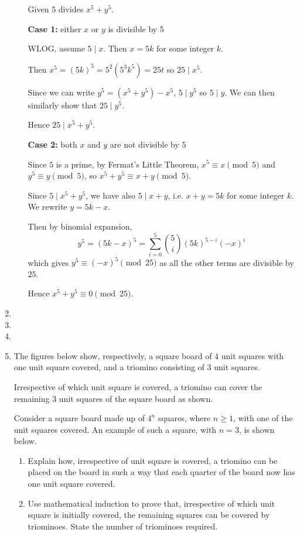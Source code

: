 \begin{enumerate}
\begin{solution}
\begin{enumerate}[label=(\roman*)]
Given $5$ divides $x^5+y^5$.

\textbf{Case 1:} either $x$ or $y$ is divisible by 5

WLOG, assume $5\mid x$. Then $x=5k$ for some integer $k$.

Then $x^5=(5k)^5=5^2(5^3k^5)=25t$ so $25\mid x^5$.

Since we can write $y^5=(x^5+y^5)-x^5$, $5\mid y^5$ so $5\mid y$. We can then similarly show that $25\mid y^5$.

Hence $25\mid x^5+y^5$.

\textbf{Case 2:} both $x$ and $y$ are not divisible by $5$

Since $5$ is a prime, by Fermat's Little Theorem, $x^5\equiv x\pmod 5$ and $y^5\equiv y\pmod 5$, so $x^5+y^5\equiv x+y\pmod 5$.

Since $5\mid x^5+y^5$, we have also $5\mid x+y$, i.e. $x+y=5k$ for some integer $k$. We rewrite $y=5k-x$.

Then by binomial expansion,
\[ y^5=(5k-x)^5=\sum_{i=0}^5\binom{5}{i}(5k)^{5-i}(-x)^i \]
which gives $y^5\equiv(-x)^5\pmod {25}$ as all the other terms are divisible by $25$.

Hence $x^5+y^5\equiv0\pmod {25}$.
\end{enumerate}
\end{solution}

\item 
\item 
\item 
\item The figures below show, respectively, a square board of 4 unit squares with one unit square covered, and a triomino consisting of 3 unit squares.

Irrespective of which unit square is covered, a triomino can cover the remaining 3 unit squares of the square board as shown.

Consider a square board made up of $4^n$ squares, where $n\ge1$, with one of the unit squares covered. An example of such a square, with $n=3$, is shown below.

\begin{enumerate}[label=(\roman*)]
\item Explain how, irrespective of unit square is covered, a triomino can be placed on the board in such a way that each quarter of the board now has one unit square covered.
\item Use mathematical induction to prove that, irrespective of which unit square is initially covered, the remaining squares can be covered by triominoes. State the number of triominoes required.
\end{enumerate}
\end{enumerate}

